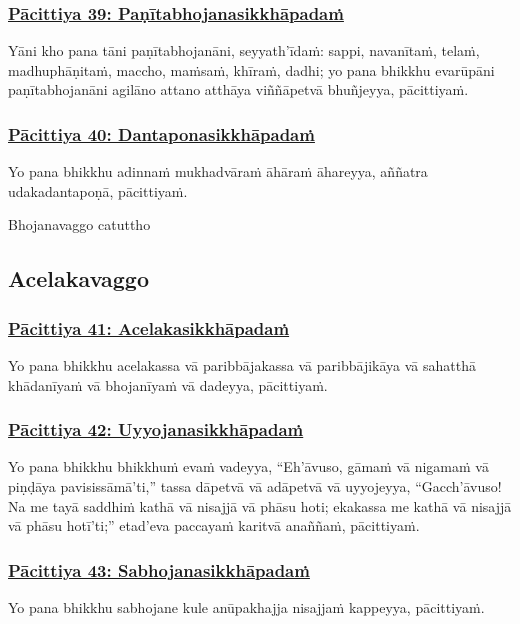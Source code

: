 \subsubsection*{\hyperref[exp39]{Pācittiya 39: Paṇītabhojanasikkhāpadaṁ}}
\label{pac39}
Yāni kho pana tāni paṇītabhojanāni, seyyath'īdaṁ: sappi, navanītaṁ, telaṁ, madhuphāṇitaṁ, maccho, maṁsaṁ, khīraṁ, dadhi; yo pana bhikkhu evarūpāni paṇītabhojanāni agilāno attano atthāya viññāpetvā bhuñjeyya, pācittiyaṁ.

\subsubsection*{\hyperref[exp40]{Pācittiya 40: Dantaponasikkhāpadaṁ}}
\label{pac40}
Yo pana bhikkhu adinnaṁ mukhadvāraṁ āhāraṁ āhareyya, aññatra udakadantapoṇā, pācittiyaṁ.

\begin{center}
  Bhojanavaggo catuttho
\end{center}

\subsection{Acelakavaggo}
\vspace{0.2cm}

\subsubsection*{\hyperref[exp41]{Pācittiya 41: Acelakasikkhāpadaṁ}}
\label{pac41}
Yo pana bhikkhu acelakassa vā paribbājakassa vā paribbājikāya vā sahatthā khādanīyaṁ vā bhojanīyaṁ vā dadeyya, pācittiyaṁ.

\subsubsection*{\hyperref[exp42]{Pācittiya 42: Uyyojanasikkhāpadaṁ}}
\label{pac42}
Yo pana bhikkhu bhikkhuṁ evaṁ vadeyya, ``Eh'āvuso, gāmaṁ vā nigamaṁ vā piṇḍāya pavisissāmā'ti,'' tassa dāpetvā vā adāpetvā vā uyyojeyya, ``Gacch'āvuso! Na me tayā saddhiṁ kathā vā nisajjā vā phāsu hoti; ekakassa me kathā vā nisajjā vā phāsu hotī'ti;'' etad'eva paccayaṁ karitvā anaññaṁ, pācittiyaṁ.

\subsubsection*{\hyperref[exp43]{Pācittiya 43: Sabhojanasikkhāpadaṁ}}
\label{pac43}
Yo pana bhikkhu sabhojane kule anūpakhajja nisajjaṁ kappeyya, pācittiyaṁ.

